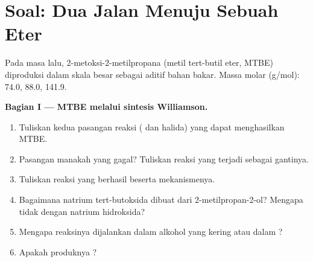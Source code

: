 \section{Soal: Dua Jalan Menuju Sebuah Eter}

\begin{problem}
\label{pb:b1:alcohol-activation:1}
Pada masa lalu, 2-metoksi-2-metilpropana (metil tert-butil eter, MTBE)
diproduksi dalam skala besar sebagai aditif bahan bakar. Massa molar
(\unit{g/mol}):  74.0,  88.0,  141.9.

\medskip
\noindent\textbf{Bagian I --- MTBE melalui sintesis Williamson.}
\begin{enumerate}
  \item Tuliskan kedua pasangan reaksi ( dan halida) yang dapat
        menghasilkan MTBE.
  \item Pasangan manakah yang gagal? Tuliskan reaksi yang terjadi sebagai
        gantinya.
  \item Tuliskan reaksi yang berhasil beserta mekanismenya.
  \item Bagaimana natrium tert-butoksida dibuat dari 2-metilpropan-2-ol?
        Mengapa tidak dengan natrium hidroksida?
  \item Mengapa reaksinya dijalankan dalam alkohol yang kering atau dalam
        ?
  \item Apakah produknya ?
\end{enumerate}


\end{problem}
